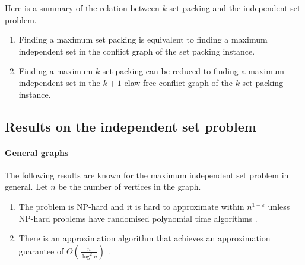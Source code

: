 Here is a summary of the relation between $k$-set packing and the independent set problem.

\begin{enumerate}
  \item Finding a maximum set packing is equivalent to finding a maximum independent set in the conflict graph of the set packing instance.
  \item Finding a maximum $k$-set packing can be reduced to finding a maximum independent set in the $k+1$-claw free conflict graph of the $k$-set packing instance. %
\end{enumerate}

\subsection{Results on the independent set problem}\label{subsec:ResultsIS}

\paragraph{General graphs} The following results are known for the maximum independent set problem in general. Let $n$ be the number of vertices in the graph.
%
\begin{enumerate}
  \item The problem is NP-hard and it is hard to approximate within $n^{1 - \varepsilon}$ unless NP-hard problems have randomised polynomial time algorithms \cite{CliqueIsHard}.
  \item There is an approximation algorithm that achieves an approximation guarantee of $\Theta\left( \frac{n}{\log^2 n} \right)$ \cite{ApproxGeneralIS}.
\end{enumerate}
%

